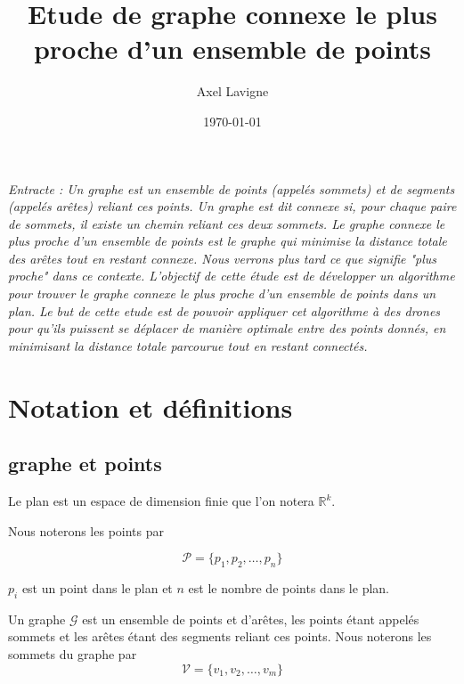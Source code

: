 \documentclass[12pt,a4paper]{article}
\title{Etude de graphe connexe le plus proche d'un ensemble de points}
\author{Axel Lavigne}
\date{\today}
\begin{document}
\maketitle


\textit{Entracte : 
    Un graphe est un ensemble de points (appelés sommets) et de segments (appelés arêtes) reliant ces points. 
    Un graphe est dit connexe si, pour chaque paire de sommets, il existe un chemin reliant ces deux sommets. 
    Le graphe connexe le plus proche d'un ensemble de points est le graphe qui minimise la distance totale des arêtes tout en restant connexe.
    Nous verrons plus tard ce que signifie "plus proche" dans ce contexte.
    L'objectif de cette étude est de développer un algorithme pour trouver le graphe connexe le plus proche d'un ensemble de points dans un plan.
    Le but de cette etude est de pouvoir appliquer cet algorithme à des drones pour qu'ils puissent se déplacer de manière optimale entre des points donnés, 
    en minimisant la distance totale parcourue tout en restant connectés.
}


\section{Notation et définitions}

\subsection{graphe et points}


Le plan est un espace de dimension finie que l'on notera \( \mathbb{R}^k \). 

Nous noterons les points par 

\begin{equation*}
    \mathcal{P}  = \{ p_1, p_2, \ldots, p_n \}
\end{equation*}

\( p_i \) est un point dans le plan et $n$ est le nombre de points dans le plan.

Un graphe $\mathcal{G}$ est un ensemble de points et d'arêtes, 
les points étant appelés sommets et les arêtes étant des segments reliant ces points.
Nous noterons les sommets du graphe par
\begin{equation*}
    \mathcal{V}  = \{ v_1, v_2, \ldots, v_m \}
\end{equation*}
\end{document}
